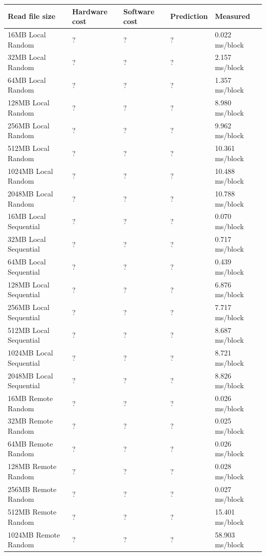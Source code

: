 \begin{table}[h]
\begin{center}
\begin{tabular}{| l | l | l | l | l |}
\hline
Read file size & Hardware cost & Software cost & Prediction & Measured \\ \hline

16MB Local Random		& ?		& ?       & ?        & 0.022  ms/block \\ \hline
32MB Local Random		& ?		& ?       & ?        & 2.157  ms/block \\ \hline
64MB Local Random		& ?		& ?       & ?        & 1.357  ms/block \\ \hline
128MB Local Random 		& ?		& ?       & ?        & 8.980  ms/block \\ \hline
256MB Local Random		& ?		& ?       & ?        & 9.962  ms/block \\ \hline
512MB Local Random		& ?		& ?       & ?        & 10.361  ms/block \\ \hline
1024MB Local Random		& ?		& ?       & ?        & 10.488  ms/block \\ \hline
2048MB Local Random		& ?		& ?       & ?        & 10.788  ms/block \\ \hline\hline

16MB Local Sequential		& ?		& ?       & ?        & 0.070   ms/block \\ \hline
32MB Local Sequential		& ?		& ?       & ?        & 0.717   ms/block \\ \hline
64MB Local Sequential		& ?		& ?       & ?        & 0.439   ms/block \\ \hline
128MB Local Sequential 	& ?		& ?       & ?        & 6.876   ms/block \\ \hline
256MB Local Sequential	& ?		& ?       & ?        & 7.717   ms/block \\ \hline
512MB Local Sequential	& ?		& ?       & ?        & 8.687   ms/block \\ \hline
1024MB Local Sequential	& ?		& ?       & ?        & 8.721   ms/block \\ \hline
2048MB Local Sequential	& ?		& ?       & ?        & 8.826   ms/block \\ \hline\hline

16MB Remote Random		& ?		& ?       & ?        & 0.026   ms/block \\ \hline
32MB Remote Random		& ?		& ?       & ?        & 0.025   ms/block \\ \hline
64MB Remote Random		& ?		& ?       & ?        & 0.026   ms/block \\ \hline
128MB Remote Random 		& ?		& ?       & ?        & 0.028   ms/block \\ \hline
256MB Remote Random		& ?		& ?       & ?        & 0.027   ms/block \\ \hline
512MB Remote Random		& ?		& ?       & ?        & 15.401   ms/block \\ \hline
1024MB Remote Random		& ?		& ?       & ?        & 58.903   ms/block \\ \hline\hline


\end{tabular}
\end{center}
\end{table}
